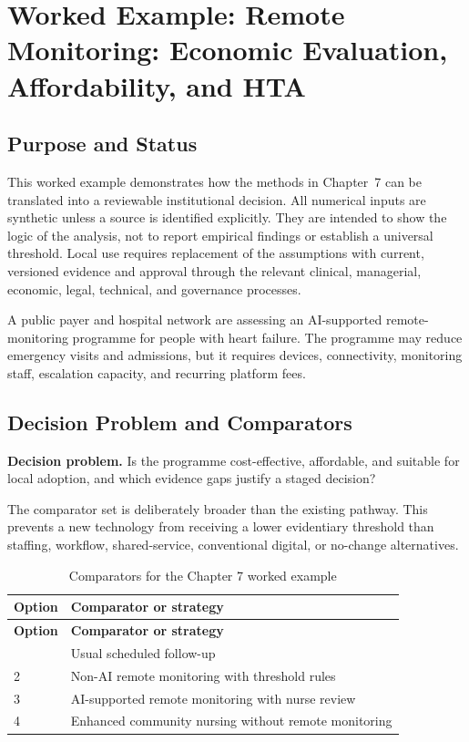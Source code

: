 \section{Worked Example: Remote Monitoring: Economic Evaluation, Affordability, and HTA}
\label{sec:comp-ch07-worked-example}

\subsection{Purpose and Status}
This worked example demonstrates how the methods in Chapter~7 can be
translated into a reviewable institutional decision. All numerical inputs are
synthetic unless a source is identified explicitly. They are intended to show the
logic of the analysis, not to report empirical findings or establish a universal
threshold. Local use requires replacement of the assumptions with current,
versioned evidence and approval through the relevant clinical, managerial,
economic, legal, technical, and governance processes.

A public payer and hospital network are assessing an AI-supported remote-monitoring programme for people with heart failure. The programme may reduce emergency visits and admissions, but it requires devices, connectivity, monitoring staff, escalation capacity, and recurring platform fees. 

\subsection{Decision Problem and Comparators}
\textbf{Decision problem.} Is the programme cost-effective, affordable, and suitable for local adoption, and which evidence gaps justify a staged decision?

The comparator set is deliberately broader than the existing pathway. This prevents
a new technology from receiving a lower evidentiary threshold than staffing,
workflow, shared-service, conventional digital, or no-change alternatives.

\begin{longtable}{@{}p{}p{}@{}}
\caption{Comparators for the Chapter 7 worked example}
\label{tab:comp-ch07-comparators}\\
\toprule
\textbf{Option} & \textbf{Comparator or strategy} \\
\midrule
\endfirsthead
\toprule
\textbf{Option} & \textbf{Comparator or strategy} \\
\midrule
\endhead
\bottomrule
\endlastfoot
1 & Usual scheduled follow-up \\
2 & Non-AI remote monitoring with threshold rules \\
3 & AI-supported remote monitoring with nurse review \\
4 & Enhanced community nursing without remote monitoring \\
\end{longtable}

